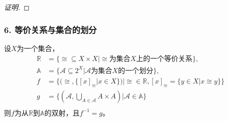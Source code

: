 \documentclass{beamer}
\begin{document}
\begin{CJK*}{UTF8}{gbsn}
\begin{frame}
\begin{proof}[证明]
  \end{proof}
\end{frame}

\begin{frame}
  \frametitle{6. 等价关系与集合的划分}
  \begin{Thm}
    设$X$为一个集合，
    \begin{align*}
    \mathbb{R} &= \{\cong \subseteq X \times X | \cong\text{为集合}X\text{上的一个等价关系}\},\\
      \mathbb{A} &= \{\mathscr{A} \subseteq 2^X| \mathscr{A}\text{为集合}X\text{的一个划分}\},\\
      f &= \{(\cong, \{[x]_{\cong} | x \in X\})|\cong \in \mathbb{R}, [x]_{\cong}=\{y\in X | x \cong y\}\}\\
      g&=\{(\mathscr{A}, \bigcup_{A \in \mathscr{A}}A\times A)|\mathscr{A} \in \mathbb{A}\}\\
    \end{align*}
    则$f$为从$\mathbb{R}$到$\mathbb{A}$的双射，且$f^{-1}=g$。
  \end{Thm}
  
\end{frame}


\end{CJK*}
\end{document}
